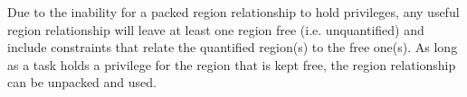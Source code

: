 
Due to the inability for a packed region relationship to hold privileges, any
useful region relationship will leave at least one region free (i.e. unquantified) and include constraints that relate the quantified region(s) to the free one(s).  As long as a task holds a privilege for the region that is kept free, the
region relationship can be unpacked and used.



%
%
